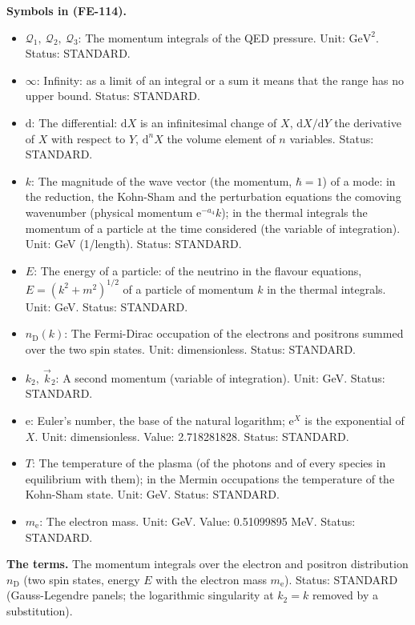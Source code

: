 \documentclass[
  10pt,
]{article}
\providecommand{\tightlist}{%
  \setlength{\itemsep}{0pt}\setlength{\parskip}{0pt}}
\begin{document}
\textbf{Symbols in (FE-114).}

\begin{itemize}
\tightlist
\item
  \(\mathcal{Q}_1,\ \mathcal{Q}_2,\ \mathcal{Q}_3\): The momentum
  integrals of the QED pressure. Unit: \(\mathrm{GeV}^{2}\). Status:
  STANDARD.
\item
  \(\infty\): Infinity: as a limit of an integral or a sum it means that
  the range has no upper bound. Status: STANDARD.
\item
  \(\mathrm{d}\): The differential: \(\mathrm{d}X\) is an infinitesimal
  change of \(X\), \(\mathrm{d}X/\mathrm{d}Y\) the derivative of \(X\)
  with respect to \(Y\), \(\mathrm{d}^nX\) the volume element of \(n\)
  variables. Status: STANDARD.
\item
  \(k\): The magnitude of the wave vector (the momentum, \(\hbar = 1\))
  of a mode: in the reduction, the Kohn-Sham and the perturbation
  equations the comoving wavenumber (physical momentum
  \(\mathrm{e}^{-a_4}k\)); in the thermal integrals the momentum of a
  particle at the time considered (the variable of integration). Unit:
  GeV (1/length). Status: STANDARD.
\item
  \(E\): The energy of a particle: of the neutrino in the flavour
  equations, \(E = (k^2 + m^2)^{1/2}\) of a particle of momentum \(k\)
  in the thermal integrals. Unit: GeV. Status: STANDARD.
\item
  \(n_{\mathrm{D}}(k)\): The Fermi-Dirac occupation of the electrons and
  positrons summed over the two spin states. Unit: dimensionless.
  Status: STANDARD.
\item
  \(k_2,\ \vec k_2\): A second momentum (variable of integration). Unit:
  GeV. Status: STANDARD.
\item
  \(\mathrm{e}\): Euler's number, the base of the natural logarithm;
  \(\mathrm{e}^{X}\) is the exponential of \(X\). Unit: dimensionless.
  Value: 2.718281828. Status: STANDARD.
\item
  \(T\): The temperature of the plasma (of the photons and of every
  species in equilibrium with them); in the Mermin occupations the
  temperature of the Kohn-Sham state. Unit: GeV. Status: STANDARD.
\item
  \(m_{\mathrm{e}}\): The electron mass. Unit: GeV. Value: 0.51099895
  MeV. Status: STANDARD.
\end{itemize}

\textbf{The terms.} The momentum integrals over the electron and
positron distribution \(n_{\mathrm{D}}\) (two spin states, energy \(E\)
with the electron mass \(m_{\mathrm{e}}\)). Status: STANDARD
(Gauss-Legendre panels; the logarithmic singularity at \(k_2 = k\)
removed by a substitution).
\end{document}
